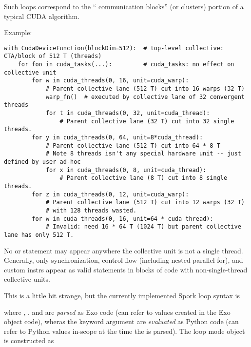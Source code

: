 \filbreak
Such loops correspond to the `` communication  blocks'' (or clusters) portion of a typical CUDA algorithm.

\filbreak
Example:
{\color{lightttColor}
\begin{verbatim}
with CudaDeviceFunction(blockDim=512):  # top-level collective: CTA/block of 512 T (threads)
    for foo in cuda_tasks(...):         # cuda_tasks: no effect on collective unit
        for w in cuda_threads(0, 16, unit=cuda_warp):
            # Parent collective lane (512 T) cut into 16 warps (32 T)
            warp_fn()  # executed by collective lane of 32 convergent threads
            for t in cuda_threads(0, 32, unit=cuda_thread):
                # Parent collective lane (32 T) cut into 32 single threads.
        for y in cuda_threads(0, 64, unit=8*cuda_thread):
            # Parent collective lane (512 T) cut into 64 * 8 T
            # Note 8 threads isn't any special hardware unit -- just defined by user ad-hoc
            for x in cuda_threads(0, 8, unit=cuda_thread):
                # Parent collective lane (8 T) cut into 8 single threads.
        for z in cuda_threads(0, 12, unit=cuda_warp):
            # Parent collective lane (512 T) cut into 12 warps (32 T)
            # with 128 threads wasted.
        for w in cuda_threads(0, 16, unit=64 * cuda_thread):
            # Invalid: need 16 * 64 T (1024 T) but parent collective lane has only 512 T.
\end{verbatim}
}

\filbreak
No  or  statement may appear anywhere the collective unit is not a single thread.
Generally, only synchronization, control flow (including nested parallel for), and custom instrs appear as valid statements in blocks of code with non-single-thread collective units.

\filbreak
{}

This is a little bit strange, but the currently implemented Spork loop syntax is


where , , and  are \textit{parsed} as Exo code (can refer to values created in the Exo object code), wheras the keyword argument  are \textit{evaluated} as Python code (can refer to Python values in-scope at the time the  is parsed).
The loop mode object is constructed as


